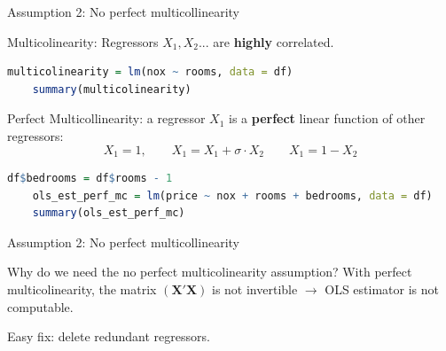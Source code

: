 \documentclass[11pt, aspectratio = 169]{beamer}
\begin{document}

\begin{frame}[fragile]{Assumption 2: No perfect multicollinearity}

    Multicolinearity: Regressors $X_{1}, X_{2}...$ are \textbf{highly} correlated.
    \begin{lstlisting}[language=R]
    multicolinearity = lm(nox ~ rooms, data = df)
    summary(multicolinearity)
    \end{lstlisting}
    \pause
    \alert{Perfect} Multicollinearity: a regressor $X_1$ is a \textbf{perfect} linear function of other regressors:
        $$
        X_1 = 1, \quad \quad X_1 = X_1 + \sigma \cdot X_2 \quad \quad X_1 = 1 - X_2
        $$
    \vspace{-0.6cm}
    \begin{lstlisting}[language=R]
    df$bedrooms = df$rooms - 1
    ols_est_perf_mc = lm(price ~ nox + rooms + bedrooms, data = df)
    summary(ols_est_perf_mc)
    \end{lstlisting}
\end{frame}

\begin{frame}[fragile]{Assumption 2: No perfect multicollinearity}

\begin{block}{Why do we need the no perfect multicolinearity assumption?}
    \pause
    With perfect multicolinearity, the matrix $(\mathbf{X}'\mathbf{X})$ is not invertible $\rightarrow$ OLS estimator is not computable.
\end{block}
\pause
Easy fix: delete \alert{redundant} regressors. 
\end{frame}
\end{document}
